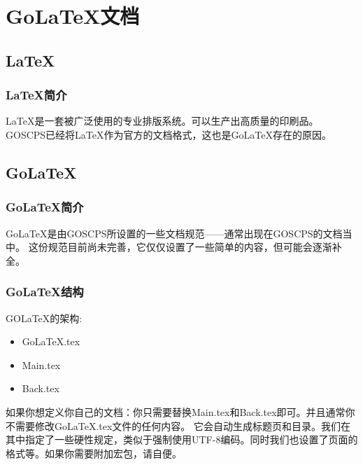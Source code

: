 \chapter{Go\LaTeX{}文档}
\section{\LaTeX{}}
\subsection{\LaTeX{}简介}

\LaTeX{}是一套被广泛使用的专业排版系统。可以生产出高质量的印刷品。
GOSCPS已经将\LaTeX{}作为官方的文档格式，这也是Go\LaTeX{}存在的原因。

\section{Go\LaTeX{}}
\subsection{Go\LaTeX{}简介}
Go\LaTeX{}是由GOSCPS所设置的一些文档规范——通常出现在G\-OS\-CP\-S的文档当中。
这份规范目前尚未完善，它仅仅设置了一些简单的内容，但可能会逐渐补全。

\subsection{Go\LaTeX{}结构}
GO\LaTeX{}的架构:

\begin{itemize}
    \item Go\LaTeX{}.tex
    \item Main.tex
    \item Back.tex
\end{itemize}

如果你想定义你自己的文档：你只需要替换Main.tex和Back.tex即可。并且通常你不需要修改Go\LaTeX{}.tex文件的任何内容。
它会自动生成标题页和目录。我们在其中指定了一些硬性规定，类似于强制使用UTF-8编码。同时我们也设置了页面的格式等。如果你需要附加宏包，请自便。